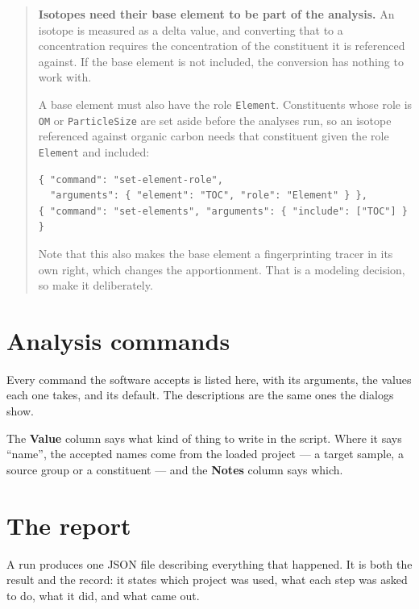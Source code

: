 \documentclass[11pt,a4paper]{report}
\begin{document}
\begin{quote}
\small
\textbf{Isotopes need their base element to be part of the analysis.} An
isotope is measured as a delta value, and converting that to a concentration
requires the concentration of the constituent it is referenced against. If the
base element is not included, the conversion has nothing to work with.

A base element must also have the role \texttt{Element}. Constituents whose
role is \texttt{OM} or \texttt{ParticleSize} are set aside before the analyses
run, so an isotope referenced against organic carbon needs that constituent
given the role \texttt{Element} and included:

\begin{lstlisting}[language=scriptjson]
{ "command": "set-element-role",
  "arguments": { "element": "TOC", "role": "Element" } },
{ "command": "set-elements", "arguments": { "include": ["TOC"] } }
\end{lstlisting}

Note that this also makes the base element a fingerprinting tracer in its own
right, which changes the apportionment. That is a modeling decision, so make
it deliberately.
\end{quote}

\chapter{Analysis commands}
\label{ch:commands}

Every command the software accepts is listed here, with its arguments, the
values each one takes, and its default. The descriptions are the same ones the
dialogs show.

The \textbf{Value} column says what kind of thing to write in the script.
Where it says ``name'', the accepted names come from the loaded project --- a
target sample, a source group or a constituent --- and the \textbf{Notes}
column says which.



\chapter{The report}
\label{ch:report}

A run produces one JSON file describing everything that happened. It is both
the result and the record: it states which project was used, what each step was
asked to do, what it did, and what came out.
\end{document}
